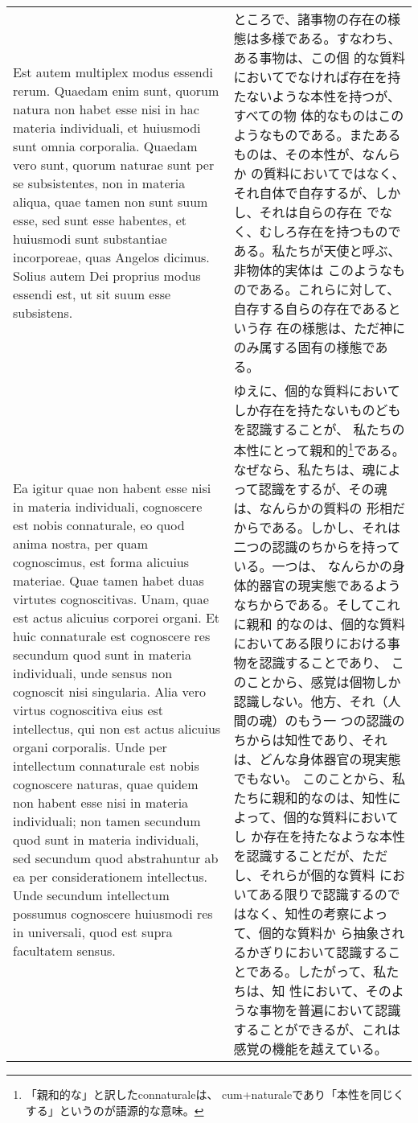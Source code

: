 \documentclass[10pt]{jsarticle} %
\begin{document}
\begin{longtable}{p{21em}p{21em}}
\\


Est autem multiplex modus essendi rerum. Quaedam enim sunt, quorum
natura non habet esse nisi in hac materia individuali, et huiusmodi
sunt omnia corporalia. Quaedam vero sunt, quorum naturae sunt per se
subsistentes, non in materia aliqua, quae tamen non sunt suum esse,
sed sunt esse habentes, et huiusmodi sunt substantiae incorporeae,
quas Angelos dicimus. Solius autem Dei proprius modus essendi est, ut
sit suum esse subsistens.


&

ところで、諸事物の存在の様態は多様である。すなわち、ある事物は、この個
的な質料においてでなければ存在を持たないような本性を持つが、すべての物
体的なものはこのようなものである。またあるものは、その本性が、なんらか
の質料においてではなく、それ自体で自存するが、しかし、それは自らの存在
でなく、むしろ存在を持つものである。私たちが天使と呼ぶ、非物体的実体は
このようなものである。これらに対して、自存する自らの存在であるという存
在の様態は、ただ神にのみ属する固有の様態である。

\\


Ea igitur quae non habent esse nisi in materia individuali, cognoscere
est nobis connaturale, eo quod anima nostra, per quam cognoscimus, est
forma alicuius materiae. Quae tamen habet duas virtutes
cognoscitivas. Unam, quae est actus alicuius corporei organi. Et huic
connaturale est cognoscere res secundum quod sunt in materia
individuali, unde sensus non cognoscit nisi singularia. Alia vero
virtus cognoscitiva eius est intellectus, qui non est actus alicuius
organi corporalis. Unde per intellectum connaturale est nobis
cognoscere naturas, quae quidem non habent esse nisi in materia
individuali; non tamen secundum quod sunt in materia individuali, sed
secundum quod abstrahuntur ab ea per considerationem intellectus. Unde
secundum intellectum possumus cognoscere huiusmodi res in universali,
quod est supra facultatem sensus. 






&

ゆえに、個的な質料においてしか存在を持たないものどもを認識することが、
私たちの本性にとって親和的\footnote{「親和的な」と訳したconnaturaleは、
cum+naturaleであり「本性を同じくする」というのが語源的な意味。}である。
なぜなら、私たちは、魂によって認識をするが、その魂は、なんらかの質料の
形相だからである。しかし、それは二つの認識のちからを持っている。一つは、
なんらかの身体的器官の現実態であるようなちからである。そしてこれに親和
的なのは、個的な質料においてある限りにおける事物を認識することであり、
このことから、感覚は個物しか認識しない。他方、それ（人間の魂）のもう一
つの認識のちからは知性であり、それは、どんな身体器官の現実態でもない。
このことから、私たちに親和的なのは、知性によって、個的な質料においてし
か存在を持たなような本性を認識することだが、ただし、それらが個的な質料
においてある限りで認識するのではなく、知性の考察によって、個的な質料か
ら抽象されるかぎりにおいて認識することである。したがって、私たちは、知
性において、そのような事物を普遍において認識することができるが、これは
感覚の機能を越えている。



\end{longtable}
\end{document}

